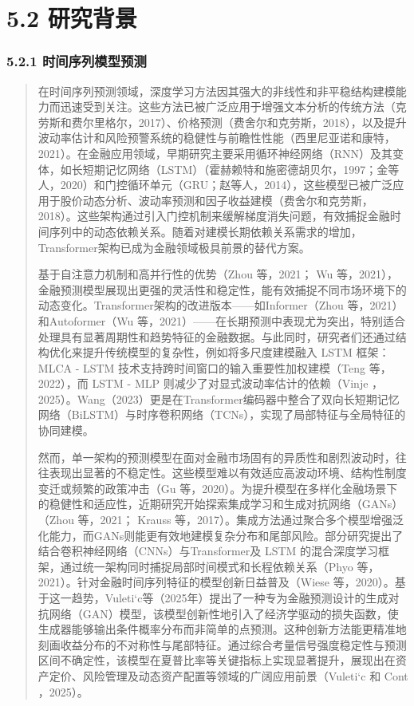 \documentclass[UTF8]{ctexart}
\begin{document}
\section{5.2 研究背景}\label{ux7814ux7a76ux80ccux666f-1}

\subsubsection{5.2.1
时间序列模型预测}\label{ux65f6ux95f4ux5e8fux5217ux6a21ux578bux9884ux6d4b}

\begin{quote}
在时间序列预测领域，深度学习方法因其强大的非线性和非平稳结构建模能力而迅速受到关注。这些方法已被广泛应用于增强文本分析的传统方法（克劳斯和费尔里格尔，2017）、价格预测（费舍尔和克劳斯，2018），以及提升波动率估计和风险预警系统的稳健性与前瞻性性能（西里尼亚诺和康特，2021）。在金融应用领域，早期研究主要采用循环神经网络（RNN）及其变体，如长短期记忆网络（LSTM）（霍赫赖特和施密德胡贝尔，1997；金等人，2020）和门控循环单元（GRU；赵等人，2014），这些模型已被广泛应用于股价动态分析、波动率预测和因子收益建模（费舍尔和克劳斯，2018）。这些架构通过引入门控机制来缓解梯度消失问题，有效捕捉金融时间序列中的动态依赖关系。随着对建模长期依赖关系需求的增加，Transformer架构已成为金融领域极具前景的替代方案。

基于自注意力机制和高并行性的优势（Zhou 等，2021； Wu
等，2021），金融预测模型展现出更强的灵活性和稳定性，能有效捕捉不同市场环境下的动态变化。Transformer架构的改进版本------如Informer（Zhou
等，2021）和Autoformer（Wu
等，2021）------在长期预测中表现尤为突出，特别适合处理具有显著周期性和趋势特征的金融数据。与此同时，研究者们还通过结构优化来提升传统模型的复杂性，例如将多尺度建模融入
LSTM 框架： MLCA - LSTM 技术支持跨时间窗口的输入重要性加权建模（Teng
等，2022），而 LSTM - MLP 则减少了对显式波动率估计的依赖（Vinje
，2025）。Wang（2023）更是在Transformer编码器中整合了双向长短期记忆网络（BiLSTM）与时序卷积网络（TCNs），实现了局部特征与全局特征的协同建模。

然而，单一架构的预测模型在面对金融市场固有的异质性和剧烈波动时，往往表现出显著的不稳定性。这些模型难以有效适应高波动环境、结构性制度变迁或频繁的政策冲击（Gu
等，2020）。为提升模型在多样化金融场景下的稳健性和适应性，近期研究开始探索集成学习和生成对抗网络（GANs）（Zhou
等，2021； Krauss
等，2017）。集成方法通过聚合多个模型增强泛化能力，而GANs则能更有效地建模复杂分布和尾部风险。部分研究提出了结合卷积神经网络（CNNs）与Transformer及
LSTM
的混合深度学习框架，通过统一架构同时捕捉局部时间模式和长程依赖关系（Phyo
等，2021）。针对金融时间序列特征的模型创新日益普及（Wiese
等，2020）。基于这一趋势，Vuleti`c等（2025年）提出了一种专为金融预测设计的生成对抗网络（GAN）模型，该模型创新性地引入了经济学驱动的损失函数，使生成器能够输出条件概率分布而非简单的点预测。这种创新方法能更精准地刻画收益分布的不对称性与尾部特征。通过综合考量信号强度稳定性与预测区间不确定性，该模型在夏普比率等关键指标上实现显著提升，展现出在资产定价、风险管理及动态资产配置等领域的广阔应用前景（Vuleti`c
和 Cont ，2025）。
\end{quote}
\end{document}
